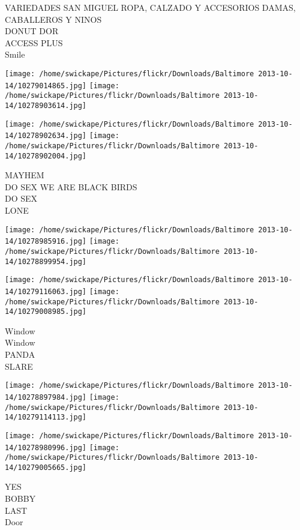 \documentclass[10pt,letterpaper]{article}
\begin{document}
VARIEDADES SAN MIGUEL ROPA, CALZADO Y ACCESORIOS DAMAS, CABALLEROS Y NINOS\\
DONUT DOR\\
ACCESS PLUS\\
Smile\\
\pagebreak

\texttt{[image: /home/swickape/Pictures/flickr/Downloads/Baltimore 2013-10-14/10279014865.jpg]}
\texttt{[image: /home/swickape/Pictures/flickr/Downloads/Baltimore 2013-10-14/10278903614.jpg]}

\texttt{[image: /home/swickape/Pictures/flickr/Downloads/Baltimore 2013-10-14/10278902634.jpg]}
\texttt{[image: /home/swickape/Pictures/flickr/Downloads/Baltimore 2013-10-14/10278902004.jpg]}

MAYHEM\\
DO SEX WE ARE BLACK BIRDS\\
DO SEX\\
LONE\\
\pagebreak

\texttt{[image: /home/swickape/Pictures/flickr/Downloads/Baltimore 2013-10-14/10278985916.jpg]}
\texttt{[image: /home/swickape/Pictures/flickr/Downloads/Baltimore 2013-10-14/10278899954.jpg]}

\texttt{[image: /home/swickape/Pictures/flickr/Downloads/Baltimore 2013-10-14/10279116063.jpg]}
\texttt{[image: /home/swickape/Pictures/flickr/Downloads/Baltimore 2013-10-14/10279008985.jpg]}

Window\\
Window\\
PANDA\\
SLARE\\
\pagebreak

\texttt{[image: /home/swickape/Pictures/flickr/Downloads/Baltimore 2013-10-14/10278897984.jpg]}
\texttt{[image: /home/swickape/Pictures/flickr/Downloads/Baltimore 2013-10-14/10279114113.jpg]}

\texttt{[image: /home/swickape/Pictures/flickr/Downloads/Baltimore 2013-10-14/10278980996.jpg]}
\texttt{[image: /home/swickape/Pictures/flickr/Downloads/Baltimore 2013-10-14/10279005665.jpg]}

YES\\
BOBBY\\
LAST\\
Door\\
\pagebreak
\end{document}
